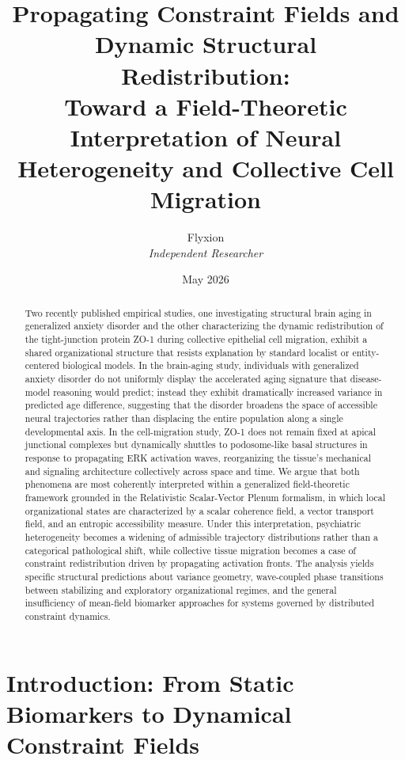 \documentclass[11pt,a4paper]{article}
\title{\textbf{Propagating Constraint Fields and Dynamic Structural Redistribution:\\
\large Toward a Field-Theoretic Interpretation of Neural\\
Heterogeneity and Collective Cell Migration}}
\author{Flyxion\\[0.5em]
\textit{Independent Researcher}}
\date{May 2026}
\theoremstyle{plain}
\theoremstyle{definition}
\begin{document}
\maketitle

\begin{abstract}
Two recently published empirical studies, one investigating structural brain aging in
generalized anxiety disorder and the other characterizing the dynamic redistribution of
the tight-junction protein ZO-1 during collective epithelial cell migration, exhibit a
shared organizational structure that resists explanation by standard localist or
entity-centered biological models. In the brain-aging study, individuals with
generalized anxiety disorder do not uniformly display the accelerated aging signature
that disease-model reasoning would predict; instead they exhibit dramatically increased
variance in predicted age difference, suggesting that the disorder broadens the space of
accessible neural trajectories rather than displacing the entire population along a single
developmental axis. In the cell-migration study, ZO-1 does not remain fixed at
apical junctional complexes but dynamically shuttles to podosome-like basal structures
in response to propagating ERK activation waves, reorganizing the tissue's mechanical
and signaling architecture collectively across space and time. We argue that both
phenomena are most coherently interpreted within a generalized field-theoretic framework
grounded in the Relativistic Scalar-Vector Plenum formalism, in which local organizational
states are characterized by a scalar coherence field, a vector transport field, and an
entropic accessibility measure. Under this interpretation, psychiatric heterogeneity
becomes a widening of admissible trajectory distributions rather than a categorical
pathological shift, while collective tissue migration becomes a case of constraint
redistribution driven by propagating activation fronts. The analysis yields specific
structural predictions about variance geometry, wave-coupled phase transitions between
stabilizing and exploratory organizational regimes, and the general insufficiency of
mean-field biomarker approaches for systems governed by distributed constraint dynamics.
\end{abstract}

\tableofcontents
\newpage

\section{Introduction: From Static Biomarkers to Dynamical Constraint Fields}
\end{document}
